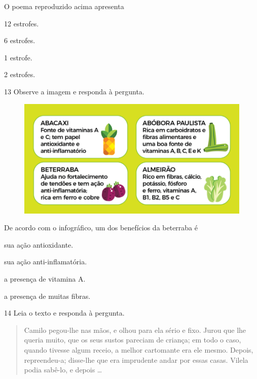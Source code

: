 \pagebreak
O poema reproduzido acima apresenta

\begin{escolha}
  \item 12 estrofes.

  \item 6 estrofes.

  \item 1 estrofe.

  \item 2 estrofes.
\end{escolha}


\num{13} Observe a imagem e responda à pergunta.

\begin{figure}[htpb!]
\includegraphics[width=\textwidth]{./imgQ4PORT/media/image4.png}
\end{figure}


De acordo com o infográfico, um dos benefícios da beterraba é

\begin{escolha}
  \item sua ação antioxidante.

  \item sua ação anti-inflamatória.

  \item a presença de vitamina A.

  \item a presença de muitas fibras.
\end{escolha}

\pagebreak
\num{14} Leia o texto e responda à pergunta.

\begin{quote}
Camilo pegou-lhe nas mãos, e olhou para ela sério e fixo. Jurou que lhe
queria muito, que os seus sustos pareciam de criança; em todo o caso,
quando tivesse algum receio, a melhor cartomante era ele mesmo. Depois,
repreendeu-a; disse-lhe que era imprudente andar por essas casas. Vilela
podia sabê-lo, e depois \ldots

\end{quote}

